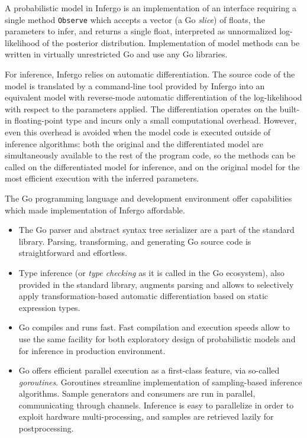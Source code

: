 \documentclass[sigplan,review,10pt,anonymous]{acmart}
\begin{document}
\begin{sloppypar}
A probabilistic model in Infergo is an implementation of an
interface requiring a single method \lstinline{Observe} which
accepts a vector (a Go \textit{slice}) of floats, the parameters
to infer, and returns a single float, interpreted as
unnormalized log-likelihood of the posterior distribution.
Implementation of model methods can be written in virtually
unrestricted Go and use any Go libraries.

For inference, Infergo relies on automatic differentiation. The
source code of the model is translated by a command-line tool
provided by Infergo into an equivalent model with reverse-mode
automatic differentiation of the log-likelihood with respect to
the parameters applied. The differentiation operates on the
built-in floating-point type and incurs only a small
computational overhead. However, even this overhead is avoided
when the model code is executed outside of inference algorithms:
both the original and the differentiated model are
simultaneously available to the rest of the program code, so the
methods can be called on the differentiated model for inference,
and on the original model for the most efficient execution with
the inferred parameters.

The Go programming language and development environment offer
capabilities which made implementation of Infergo affordable.

\begin{itemize}
\item The Go parser and abstract syntax tree serializer are
	a part of the standard library. Parsing, transforming,
	and generating Go source code is straightforward and
	effortless.
\item Type inference (or \textit{type checking} as it is
	called in the Go ecosystem), also provided in the
	standard library, augments parsing and allows to
	selectively apply transformation-based automatic
	differentiation  based on static expression types. 
\item Go compiles and runs fast. Fast compilation and
	execution speeds allow to use the same facility for both
	exploratory design of probabilistic models and for
	inference in production environment.
\item Go offers efficient parallel execution as a
	first-class feature, via so-called \textit{goroutines}.
	Goroutines streamline implementation of sampling-based
	inference algorithms. Sample generators and consumers
	are run in parallel, communicating through channels. 
	Inference is easy to parallelize in order to exploit
	hardware multi-processing, and samples are retrieved
	lazily for postprocessing. 
\end{itemize}


\end{sloppypar}
\end{document}
